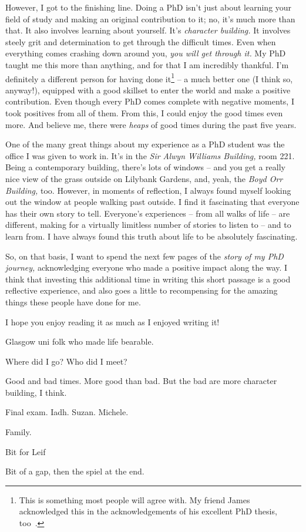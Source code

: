 \begin{preamble}
However, I got to the finishing line. Doing a PhD isn't just about learning your field of study and making an original contribution to it; no, it's much more than that. It also involves learning about yourself. It's \emph{character building.} It involves steely grit and determination to get through the difficult times. Even when everything comes crashing down around you, \emph{you will get through it.} My PhD taught me this more than anything, and for that I am incredibly thankful. I'm definitely a different person for having done it\footnote{This is something most people will agree with. My friend James acknowledged this in the acknowledgements of his excellent PhD thesis, too~\citep{mcminn2018phd}.} -- a much better one (I think so, anyway!), equipped with a good skillset to enter the world and make a positive contribution. Even though every PhD comes complete with negative moments, I took positives from all of them. From this, I could enjoy the good times even more. And believe me, there were \emph{heaps} of good times during the past five years.

One of the many great things about my experience as a PhD student was the office I was given to work in. It's in the \emph{Sir Alwyn Williams Building,} room 221. Being a contemporary building, there's lots of windows -- and you get a really nice view of the grass outside on Lilybank Gardens, and, yeah, the \emph{Boyd Orr Building,} too. However, in moments of reflection, I always found myself looking out the window at people walking past outside. I find it fascinating that everyone has their own story to tell. Everyone's experiences -- from all walks of life -- are different, making for a virtually limitless number of stories to listen to -- and to learn from. I have always found this truth about life to be absolutely fascinating.

So, on that basis, I want to spend the next few pages of the \emph{story of my PhD journey,} acknowledging everyone who made a positive impact along the way. I think that investing this additional time in writing this short passage is a good reflective experience, and also goes a little to recompensing for the amazing things these people have done for me.

I hope you enjoy reading it as much as I enjoyed writing it!

\acksep

Glasgow uni folk who made life bearable.

Where did I go? Who did I meet?

Good and bad times. More good than bad. But the bad are more character building, I think.

Final exam. Iadh. Suzan. Michele.

Family.

Bit for Leif

\acksep

Bit of a gap, then the spiel at the end.

\end{preamble}